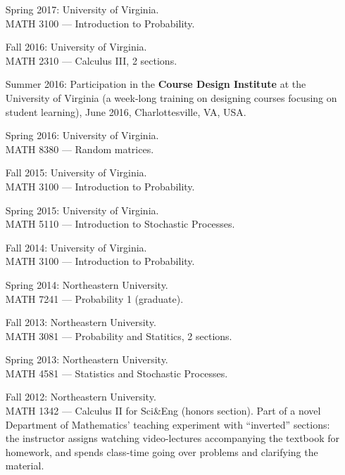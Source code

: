 \documentclass[letterpaper,11pt]{article}
\begin{document}
\begin{itemize}
	\item[Spring 2017:]
  University of Virginia. \\
  MATH 3100 --- Introduction to Probability.

	\item[Fall 2016:]
  University of Virginia. \\
  MATH 2310 --- Calculus III, 2 sections.

  \item[Summer 2016:] Participation in the \textbf{Course Design Institute} at the University of Virginia (a week-long training on designing courses focusing on student learning), June 2016, Charlottesville, VA, USA.

  \item[Spring 2016:]
  University of Virginia. \\
  MATH 8380 --- Random matrices.

  \item[Fall 2015:]   
  University of Virginia. \\
  MATH 3100 --- Introduction to Probability.

	\item[Spring 2015:]   
	University of Virginia. \\
	MATH 5110 --- Introduction to Stochastic Processes.

	\item[Fall 2014:]   
	University of Virginia. \\
	MATH 3100 --- Introduction to Probability.

  \item[Spring 2014:]   
  Northeastern University. \\
  MATH 7241 --- 
  Probability 1 (graduate).

  \item[Fall 2013:]   
  Northeastern University. \\
  MATH 3081 --- 
  Probability and Statitics, 2 sections.
  \item[Spring 2013:] 
  Northeastern University. 
  \\
  MATH 4581 --- Statistics and Stochastic Processes.
  \item[Fall 2012:]
  Northeastern University. 
  \\
  MATH 1342 --- 
  Calculus II for Sci\&Eng (honors section). Part of a novel Department of Mathematics' teaching experiment with ``inverted'' sections: the instructor assigns watching video-lectures accompanying the textbook for homework, and spends class-time going over problems and clarifying the material.


\end{itemize}
\end{document}
